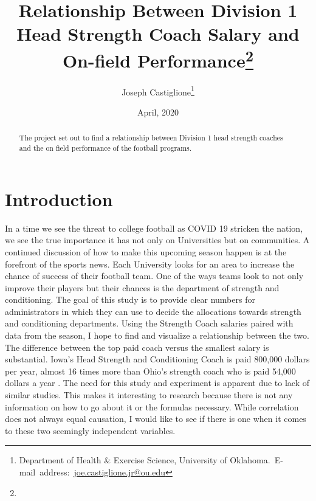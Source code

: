 \documentclass[12pt,english]{article}
\begin{document}
\begin{singlespace}
\title{Relationship Between Division 1 Head Strength Coach Salary and On-field Performance\thanks{}}
\end{singlespace}

\author{Joseph Castiglione\thanks{Department of Health & Exercise Science, University of Oklahoma.\
E-mail~address:~\href{mailto:joe.castiglione.jr@ou.edu}{joe.castiglione.jr@ou.edu}}}

\date{April, 2020}

\maketitle
\begin{abstract}
\begin{singlespace}
The project set out to find a relationship between Division 1 head strength coaches and the on field performance of the football programs. 
\end{singlespace}

\end{abstract}
\vfill{}


\pagebreak{}


\section{Introduction}\label{sec:intro}
    In a time we see the threat to college football as COVID 19 stricken the nation, we see the true importance it has not only on Universities but on communities. A continued discussion of how to make this upcoming season happen is at the forefront of the sports news. Each University looks for an area to increase the chance of success of their football team. One of the ways teams look to not only improve their players but their chances is the department of strength and conditioning. The goal of this study is to provide clear numbers for administrators in which they can use to decide the allocations towards strength and conditioning departments. Using the Strength Coach salaries paired with data from the season, I hope to find and visualize a relationship between the two. The difference between the top paid coach versus the smallest salary is substantial. Iowa's Head Strength and Conditioning Coach is paid 800,000 dollars per year, almost 16 times more than Ohio's strength coach who is paid 54,000 dollars a year \cite{gardner}. The need for this study and experiment is apparent due to lack of similar studies. This makes it interesting to research because there is not any information on how to go about it or the formulas necessary. While correlation does not always equal causation, I would like to see if there is one when it comes to these two seemingly independent variables. 
     
\end{document}

